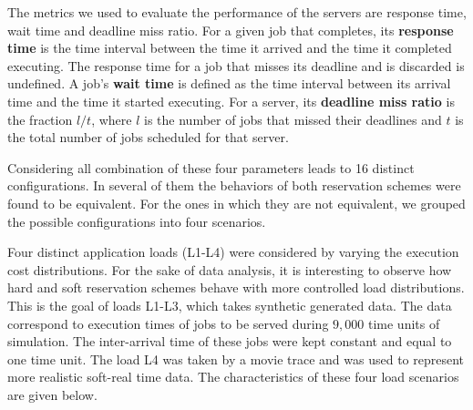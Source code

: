 \documentclass[times, 10pt,twocolumn]{article}
\begin{document}
The metrics we used to evaluate the performance of the servers are
response time, wait time and deadline miss ratio. For a given job that
completes, its \textbf{response time} is the time interval between the
time it arrived and the time it completed executing. The response time
for a job that misses its deadline and is discarded is undefined. A
job's \textbf{wait time} is defined as the time interval between its
arrival time and the time it started executing. For a server, its
\textbf{deadline miss ratio} is the fraction $l/t$, where $l$ is the
number of jobs that missed their deadlines and $t$ is the total number
of jobs scheduled for that server.

Considering all combination of these four parameters leads to 16
distinct configurations. In several of them the behaviors of both
reservation schemes were found to be equivalent.  For the ones in
which they are not equivalent, we grouped the possible configurations
into four scenarios.

\label{sec:charact-server-load}

Four distinct application loads (L1-L4) were considered by varying the
execution cost distributions.  For the sake of data analysis, it is
interesting to observe how hard and soft reservation schemes behave
with more controlled load distributions. This is the goal of loads
L1-L3, which takes synthetic generated data. The data correspond to
execution times of jobs to be served during $9,000$ time units of
simulation.  The inter-arrival time of these jobs were kept constant
and equal to one time unit.  The load L4 was taken by a movie trace
and was used to represent more realistic soft-real time data. The
characteristics of these four load scenarios are given below.
\end{document}
